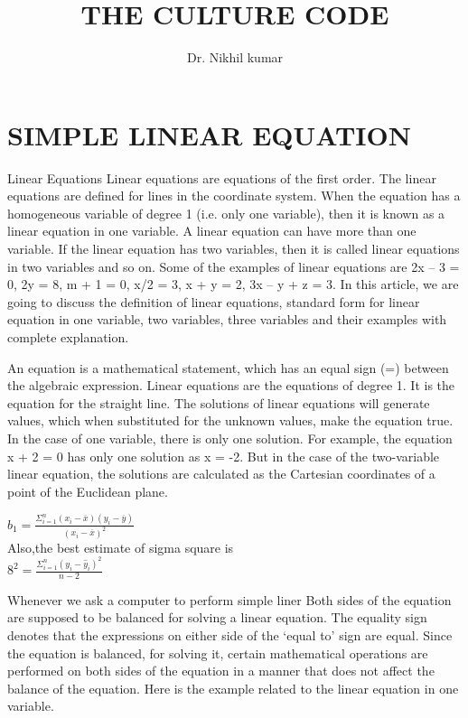 \documentclass[10pt,a4paper]{article}
\title{THE CULTURE CODE}
\author{Dr. Nikhil kumar}
\begin{document}
	\maketitle
		\section{SIMPLE LINEAR EQUATION}
	Linear Equations
	Linear equations are equations of the first order. The linear equations are defined for lines in the coordinate system. When the equation has a homogeneous variable of degree 1 (i.e. only one variable), then it is known as a linear equation in one variable. A linear equation can have more than one variable. If the linear equation has two variables, then it is called linear equations in two variables and so on. Some of the examples of linear equations are 2x – 3 = 0, 2y = 8, m + 1 = 0, x/2 = 3, x + y = 2, 3x – y + z = 3. In this article, we are going to discuss the definition of linear equations, standard form for linear equation in one variable, two variables, three variables and their examples with complete explanation.
	
	An equation is a mathematical statement, which has an equal sign (=) between the algebraic expression. Linear equations are the equations of degree 1. It is the equation for the straight line. The solutions of linear equations will generate values, which when substituted for the unknown values, make the equation true. In the case of one variable, there is only one solution. For example, the equation x + 2 = 0 has only one solution as x = -2. But in the case of the two-variable linear equation, the solutions are calculated as the Cartesian coordinates of a point of the Euclidean plane.
	
	
	$ b_{1}= \frac{\Sigma_{i=1}^{n} (x_{i}-\overline{x})(y_{i}-\overline{y})}{(x_{i}-\overline{x})^2}$\\
	
	Also,the best estimate of sigma  square  is \\
	
	$ 8^2= \frac{\Sigma_{i=1}^{n}(y_{i} - \widehat{y}_{i}) ^2}{n-2} $
	
	Whenever we ask a computer to perform simple liner Both sides of the equation are supposed to be balanced for solving a linear equation. The equality sign denotes that the expressions on either side of the ‘equal to’ sign are equal. Since the equation is balanced, for solving it, certain mathematical operations are performed on both sides of the equation in a manner that does not affect the balance of the equation. Here is the example related to the linear equation in one variable.
	
\end{document}
